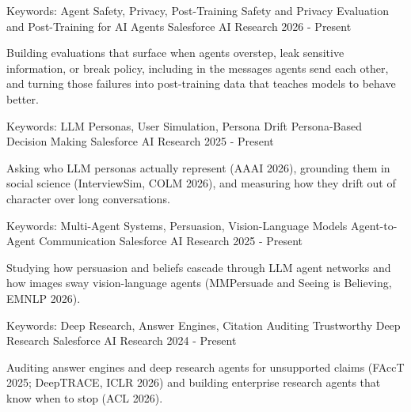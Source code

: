 \documentclass[11pt, letterpaper]{awesome-cv}
\begin{document}

\begin{cventries}
  \cventry
    {Keywords: Agent Safety, Privacy, Post-Training}
    {Safety and Privacy Evaluation and Post-Training for AI Agents}
    {Salesforce AI Research}
    {2026 - Present}
    {
      \begin{cvitems}
        \item {Building evaluations that surface when agents overstep, leak sensitive information, or break policy, including in the messages agents send each other, and turning those failures into post-training data that teaches models to behave better.}
      \end{cvitems}
    }%
  \cventry
    {Keywords: LLM Personas, User Simulation, Persona Drift}
    {Persona-Based Decision Making}
    {Salesforce AI Research}
    {2025 - Present}
    {
      \begin{cvitems}
        \item {Asking who LLM personas actually represent (AAAI 2026), grounding them in social science (InterviewSim, COLM 2026), and measuring how they drift out of character over long conversations.}
      \end{cvitems}
    }%
  \cventry
    {Keywords: Multi-Agent Systems, Persuasion, Vision-Language Models}
    {Agent-to-Agent Communication}
    {Salesforce AI Research}
    {2025 - Present}
    {
      \begin{cvitems}
        \item {Studying how persuasion and beliefs cascade through LLM agent networks and how images sway vision-language agents (MMPersuade and Seeing is Believing, EMNLP 2026).}
      \end{cvitems}
    }%
  \cventry
    {Keywords: Deep Research, Answer Engines, Citation Auditing}
    {Trustworthy Deep Research}
    {Salesforce AI Research}
    {2024 - Present}
    {
      \begin{cvitems}
        \item {Auditing answer engines and deep research agents for unsupported claims (FAccT 2025; DeepTRACE, ICLR 2026) and building enterprise research agents that know when to stop (ACL 2026).}
      \end{cvitems}
    }%
\end{cventries}

\end{document}
